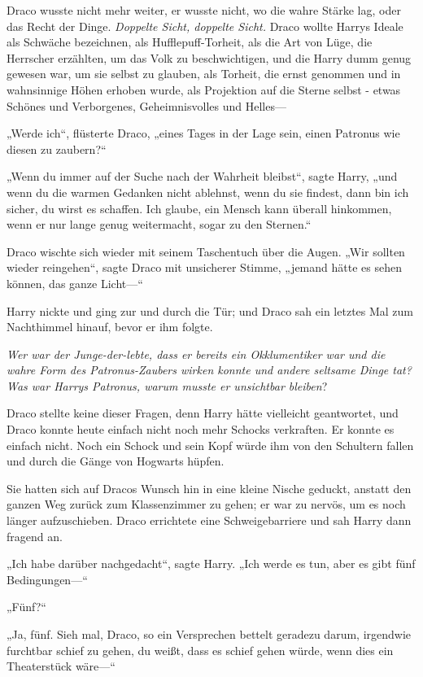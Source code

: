 {Draco wusste nicht mehr weiter, er wusste nicht, wo die wahre Stärke lag, oder das Recht der Dinge. \emph{Doppelte Sicht, doppelte Sicht.} Draco wollte Harrys Ideale als Schwäche bezeichnen, als Hufflepuff-Torheit, als die Art von Lüge, die Herrscher erzählten, um das Volk zu beschwichtigen, und die Harry dumm genug gewesen war, um sie selbst zu glauben, als Torheit, die ernst genommen und in wahnsinnige Höhen erhoben wurde, als Projektion auf die Sterne selbst - etwas Schönes und Verborgenes, Geheimnisvolles und Helles—

„Werde ich“, flüsterte Draco, „eines Tages in der Lage sein, einen Patronus wie diesen zu zaubern?“

„Wenn du immer auf der Suche nach der Wahrheit bleibst“, sagte Harry, „und wenn du die warmen Gedanken nicht ablehnst, wenn du sie findest, dann bin ich sicher, du wirst es schaffen. Ich glaube, ein Mensch kann überall hinkommen, wenn er nur lange genug weitermacht, sogar zu den Sternen.“

Draco wischte sich wieder mit seinem Taschentuch über die Augen. „Wir sollten wieder reingehen“, sagte Draco mit unsicherer Stimme, „jemand hätte es sehen können, das ganze Licht—“

Harry nickte und ging zur und durch die Tür; und Draco sah ein letztes Mal zum Nachthimmel hinauf, bevor er ihm folgte.

\emph{Wer war der Junge-der-lebte, dass er bereits ein Okklumentiker war und die wahre Form des Patronus-Zaubers wirken konnte und andere seltsame Dinge tat? Was war Harrys Patronus, warum musste er unsichtbar bleiben}?

Draco stellte keine dieser Fragen, denn Harry hätte vielleicht geantwortet, und Draco konnte heute einfach nicht noch mehr Schocks verkraften. Er konnte es einfach nicht. Noch ein Schock und sein Kopf würde ihm von den Schultern fallen und durch die Gänge von Hogwarts hüpfen.

Sie hatten sich auf Dracos Wunsch hin in eine kleine Nische geduckt, anstatt den ganzen Weg zurück zum Klassenzimmer zu gehen; er war zu nervös, um es noch länger aufzuschieben. Draco errichtete eine Schweigebarriere und sah Harry dann fragend an.

„Ich habe darüber nachgedacht“, sagte Harry. „Ich werde es tun, aber es gibt fünf Bedingungen—“

„Fünf?“

„Ja, fünf. Sieh mal, Draco, so ein Versprechen bettelt geradezu darum, irgendwie furchtbar schief zu gehen, du weißt, dass es schief gehen würde, wenn dies ein Theaterstück wäre—“

}
